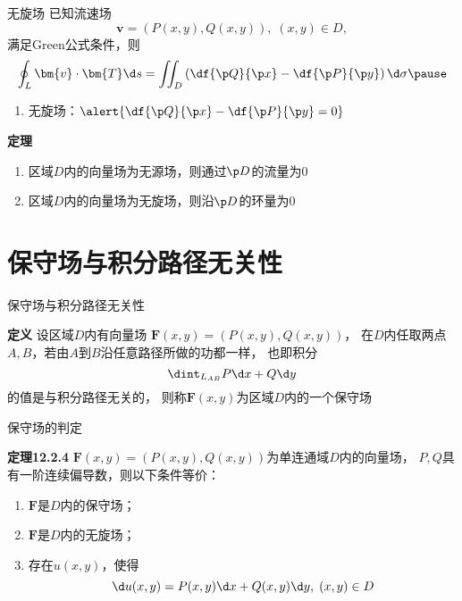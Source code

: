\begin{frame}{无旋场}
	\linespread{1.2}\pause 
		已知流速场
		$$\bm{v}=(P(x,y),Q(x,y)),\;(x,y)\in D,$$
		满足Green公式条件\pause ，则
		$$\oint_L\bm{v}\cdot\bm{T}\d s=\iint_D\left(
		\df{\p Q}{\p x}-\df{\p P}{\p y}\right)\d\sigma\pause $$
		\begin{enumerate}
		  \addtocounter{enumi}{2}
		  \item {\bb 无旋场：}$\alert{\df{\p Q}{\p x}-\df{\p P}{\p y}=0}$
		\end{enumerate}
\end{frame}

\begin{frame}
	\linespread{1.2}
	\begin{block}{{\bf 定理}\hfill}
		\begin{enumerate}
		  \item 区域$D$内的向量场为无源场，则通过$\p D$的流量为$0$
		  \item 区域$D$内的向量场为无旋场，则沿$\p D$的环量为$0$
		\end{enumerate}
	\end{block}
\end{frame}

\section{保守场与积分路径无关性}

\begin{frame}{保守场与积分路径无关性}
	\linespread{1.2}
	\begin{block}{{\bf 定义}\hfill}
		设区域$D$内有向量场
		$\bm{F}(x,y)=(P(x,y),Q(x,y))$，
		在$D$内任取两点$A,B$，若由$A$到$B$沿任意路径所做的功都一样，
		也即积分
		$$\dint_{L_{AB}}P\d x+Q\d y$$
		的值是与积分路径无关的，
		则称{\bb $\bm{F}(x,y)$为区域$D$内的一个保守场}
	\end{block}
\end{frame}

\begin{frame}{保守场的判定}
	\linespread{1.2}
	\begin{block}{{\bf 定理12.2.4}\hfill}
		$\bm{F}(x,y)=(P(x,y),Q(x,y))$为单连通域$D$内的向量场，
		$P,Q$具有一阶连续偏导数，则以下条件等价：
		\begin{enumerate}
		  \item $\bm{F}$是$D$内的保守场；
		  \item $\bm{F}$是$D$内的无旋场；
		  \item 存在$u(x,y)$，使得
		  $$\d u(x,y)=P(x,y)\d x+Q(x,y)\d y,\;(x,y)\in D$$
		\end{enumerate}
	\end{block}
\end{frame}

